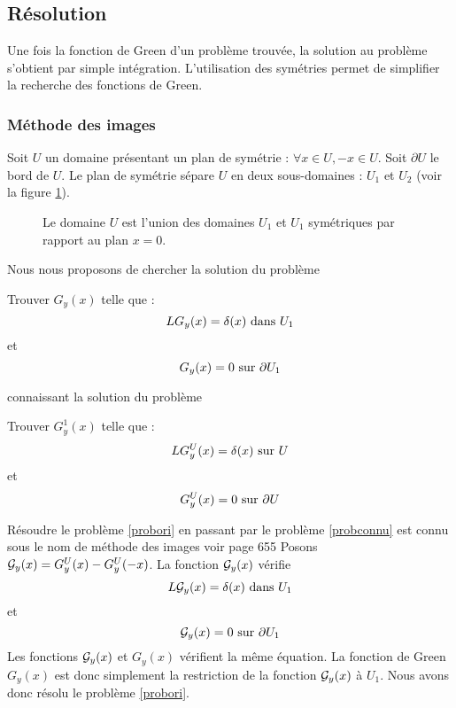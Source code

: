 \documentclass[12pt]{book}
\begin{document}
\subsection{R\'esolution}
Une fois la fonction de Green d'un probl\`eme trouv\'ee, la solution au
probl\`eme s'obtient par simple int\'egration.
L'utilisation des sym\'etries permet de simplifier la recherche des fonctions
de Green.

\subsubsection{M\'ethode des images}
Soit $U$ un domaine pr\'esentant un plan de sym\'etrie : $\forall x
\in U, -x\in U$. Soit $\partial U$ le bord de $U$.
Le plan de sym\'etrie s\'epare $U$ en deux sous-domaines : $U_1$ et
$U_2$ (voir la figure \ref{figsymet}).
\begin{figure}[htb]
 \centerline{}   
 \caption{Le domaine $U$ est l'union des domaines $U_1$ et $U_1$
sym\'etriques par rapport au plan $x=0$.}
 \label{figsymet}
\end{figure}
Nous nous proposons de chercher la solution du probl\`eme
\begin{prob}\label{probori} 
Trouver $G_y(x)$ telle que :
\begin{equation}
LG_y(x)=\delta(x)\ {\rm dans}\ U_1
\end{equation}
et
\begin{equation}
 G_y(x)=0 {\rm \ sur\ } \partial U_1
\end{equation}
\end{prob}
connaissant la solution du probl\`eme
\begin{prob}\label{probconnu}
Trouver $G^1_y(x)$ telle que :
\begin{equation}
LG^U_y(x)=\delta(x) {\rm \ sur\ } U
\end{equation}
et
\begin{equation}
 G^U_y(x)=0 {\rm \ sur\ } \partial U
\end{equation}
\end{prob}
R\'esoudre le probl\`eme \ref{probori} en passant par le probl\`eme
\ref{probconnu} est connu
sous le nom de m\'ethode des images voir \cite{ma:equad:Dautray2} page 655
Posons ${\cal G}_y(x)={G}^U_y(x)-{G}^U_y(-x)$. La fonction ${\cal
G}_y(x)$ v\'erifie  
\begin{equation}
L{\cal G}_y(x)=\delta(x)\ {\rm dans}\ U_1
\end{equation}
et
\begin{equation}
{\cal G}_y(x)=0 {\rm \ sur\ } \partial U_1
\end{equation}
Les fonctions ${\cal G}_y(x)$ et $G_y(x)$ v\'erifient la m\^eme
\'equation. La fonction de Green $G_y(x)$ 
est donc simplement la 
restriction de la fonction ${\cal G}_y(x)$ \`a $U_1$.
Nous avons donc r\'esolu le probl\`eme \ref{probori}.
\end{document}
